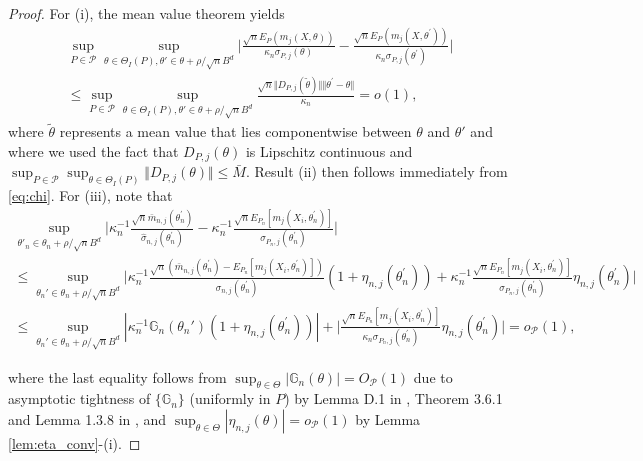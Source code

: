 \documentclass[letterpaper,11pt]{article}
\theoremstyle{myplain}
\theoremstyle{mydefinition}
\theoremstyle{myremark}
\renewcommand{\cite}{\citet}
\newcommand{\cP}{\mathcal{P}}
\numberwithin{equation}{section}
\numberwithin{figure}{section}
\begin{document}
\begin{appendices}
\begin{proof}
For (i), the mean value theorem yields 
\begin{multline}
\sup_{P \in \cP}\sup_{\theta \in \Theta_I(P),\theta'\in\theta+\rho /\sqrt nB^d}\Bigg\vert \frac{\sqrt{n}E_P(m_j(X,\theta))}{\kappa_n \sigma_{P,j}(\theta)}-\frac{\sqrt{n}E_P(m_j(X,\theta^\prime))}{\kappa_n \sigma_{P,j}(\theta^\prime)} \Bigg\vert \\
\le \sup_{P \in \cP}\sup_{\theta \in \Theta_I(P),\theta'\in\theta+\rho /\sqrt nB^d} \frac{\sqrt{n}\Vert D_{P,j}(\tilde{\theta})\Vert \Vert \theta^\prime-\theta \Vert}{\kappa_n} =o(1),\label{eq:pop_Jstar_1}
\end{multline}
where $\tilde{\theta}$ represents a mean value that lies componentwise between $\theta$ and $\theta'$ and where we used the fact that $D_{P,j}(\theta)$ is Lipschitz continuous and $\sup_{P \in \cP}\sup_{\theta \in \Theta_I(P)}\Vert D_{P,j}(\theta) \Vert \le \bar{M}$. Result (ii) then follows immediately from \eqref{eq:chi}. For (iii), note that 
\begin{multline}
\sup_{\theta'_n\in\theta_n+\rho /\sqrt nB^d}\Big|\kappa_n^{-1}\frac{\sqrt n \bar{m}_{n,j}(\theta_n^\prime)}{\hat{\sigma}_{n,j}(\theta_n^\prime)}-\kappa_n^{-1}\frac{\sqrt nE_{P_n}[m_j(X_i,\theta_n^\prime)]}{\sigma_{P_n,j}(\theta_n^\prime)}\Big|\\
\le \sup_{\theta_n'\in\theta_n+\rho /\sqrt nB^d} \Big|\kappa_n^{-1}\frac{\sqrt n (\bar{m}_{n,j}(\theta_n^\prime) - E_{P_n}[m_j(X_i,\theta_n^\prime)])}{\sigma_{n,j}(\theta_n^\prime)} (1+\eta_{n,j}(\theta_n^\prime))
+\kappa_n^{-1}\frac{\sqrt nE_{P_n}[m_j(X_i,\theta_n^\prime)]}{\sigma_{P_n,j}(\theta_n^\prime)}\eta_{n,j}(\theta_n^\prime) \Big|\\
\le \sup_{\theta_n'\in\theta_n+\rho /\sqrt nB^d}|\kappa_n^{-1}\mathbb G_n(\theta_n')(1+\eta_{n,j}(\theta_n^\prime))| + \Big| \frac{\sqrt nE_{P_n}[m_j(X_i,\theta_n^\prime)]}{\kappa_n\sigma_{P_n,j}(\theta_n^\prime)}\eta_{n,j}(\theta_n^\prime) \Big| =o_{\mathcal P}(1) ,	\label{eq:pop_Jstar_2}
\end{multline}




where the last equality follows from $\sup_{\theta\in\Theta}|\mathbb G_{n}(\theta)|=O_{\mathcal P}(1)$ due to asymptotic tightness of $\{\mathbb G_{n}\}$ (uniformly in $P$) by Lemma D.1 in \cite{BCS14_misp}, Theorem 3.6.1 and Lemma 1.3.8 in \cite{Vaart_Wellner2000aBK},  and $\sup_{\theta\in\Theta}|\eta_{n,j}(\theta)|=o_{\mathcal P}(1)$ by Lemma \ref{lem:eta_conv}-(i).
\end{proof}




\end{appendices}
\end{document}
